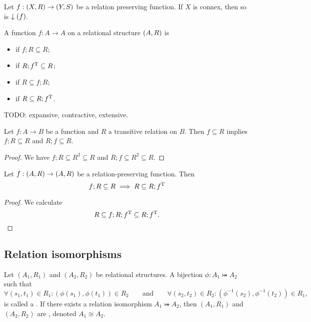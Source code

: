 \begin{lemma} \label{connexityImage}
Let $f: \left( X,R \right) \to \left( Y,S \right)$ be a relation preserving function. If $X$ is connex, then so is $\downarrow(f)$.
\end{lemma}

\begin{definition}
A function $f: A\to A$ on a relational structure $\left( A, R \right)$ is
\begin{itemize}
\item {} if $f;R \subseteq R$;
\item {} if $R;f^{\mathrm{T}} \subseteq R$;
\item {} if $R \subseteq f;R$;
\item {} if $R \subseteq R;f^{\mathrm{T}}$.
\end{itemize}
\end{definition}

TODO: expansive, contractive, extensive.

\begin{lemma} \label{transitiveRestrictiveLemma}
Let $f: A\to B$ be a function and $R$ a transitive relation on $B$. Then $f\subseteq R$ implies $f;R\subseteq R$ and $R;f\subseteq R$.
\end{lemma}
\begin{proof}
We have $f;R\subseteq R^2 \subseteq R$ and $R;f \subseteq R^2 \subseteq R$.
\end{proof}

\begin{lemma} \label{expansiveRelationPreserving}
Let $f: \left( A,R \right) \to \left( A,R \right)$ be a relation-preserving function. Then
\[ f;R \subseteq R \implies R \subseteq R;f^{\mathrm{T}} \]
\end{lemma}
\begin{proof}
We calculate
\[ R \subseteq f;R;f^{\mathrm{T}} \subseteq R;f^{\mathrm{T}}. \]
\end{proof}

\subsection{Relation isomorphisms}
\begin{definition}
Let $(A_1, R_1)$ and $(A_2, R_2)$ be relational structures. A bijection $\phi:A_1 \twoheadrightarrowtail A_2$ such that
\[ \forall (s_1,t_1)\in R_1: (\phi(s_1),\phi(t_1))\in R_2 \qquad \text{and} \qquad \forall (s_2,t_2)\in R_2: (\phi^{-1}(s_2),\phi^{-1}(t_2))\in R_1, \]
is called a . If there exists a relation isomorphism $A_1 \twoheadrightarrowtail A_2$, then $(A_1, R_1)$ and $(A_2, R_2)$ are , denoted $A_1 \cong A_2$.
\end{definition}

